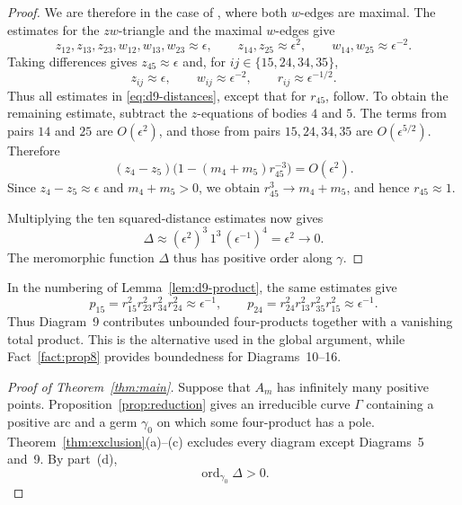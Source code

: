 \documentclass[Threeside,11pt]{article}
\theoremstyle{definition}
\theoremstyle{remark}
\numberwithin{equation}{section}
\theoremstyle{remark}
\newcommand{\ord}{\operatorname{ord}}
\begin{document}
{\begin{proof}
We are therefore in the case of \cite[\S8.9.2]{AK}, where both $w$-edges are
maximal.  The estimates for the $zw$-triangle and the maximal $w$-edges give
\[
 z_{12},z_{13},z_{23},w_{12},w_{13},w_{23}\approx\epsilon,
 \qquad z_{14},z_{25}\approx\epsilon^2,
 \qquad w_{14},w_{25}\approx\epsilon^{-2}.
\]
Taking differences gives $z_{45}\approx\epsilon$ and, for
$ij\in\{15,24,34,35\}$,
\[
 z_{ij}\approx\epsilon,\qquad w_{ij}\approx\epsilon^{-2},
 \qquad r_{ij}\approx\epsilon^{-1/2}.
\]
Thus all estimates in \eqref{eq:d9-distances}, except that for $r_{45}$, follow.
To obtain the remaining estimate, subtract the $z$-equations of bodies $4$ and $5$.
The terms from pairs $14$ and $25$ are $O(\epsilon^2)$, and those from pairs
$15,24,34,35$ are $O(\epsilon^{5/2})$.  Therefore
\[
 (z_4-z_5)\bigl(1-(m_4+m_5)r_{45}^{-3}\bigr)=O(\epsilon^2).
\]
Since $z_4-z_5\approx\epsilon$ and $m_4+m_5>0$, we obtain
$r_{45}^3\to m_4+m_5$, and hence $r_{45}\approx1$.

Multiplying the ten squared-distance estimates now gives
\[
 \Delta\approx(\epsilon^2)^3\,1^3\,(\epsilon^{-1})^4
 =\epsilon^2\longrightarrow0.
\]
The meromorphic function $\Delta$ thus has positive order along $\gamma$.
\end{proof}

In the numbering of Lemma~\ref{lem:d9-product}, the same estimates give
\[
 p_{15}=r_{15}^2r_{23}^2r_{34}^2r_{24}^2\approx\epsilon^{-1},\qquad
 p_{24}=r_{24}^2r_{13}^2r_{35}^2r_{15}^2\approx\epsilon^{-1}.
\]
Thus Diagram~9 contributes unbounded four-products together with a vanishing total product.
This is the alternative used in the global argument, while Fact~\ref{fact:prop8}
provides boundedness for Diagrams~10--16.

\begin{proof}[Proof of Theorem~\ref{thm:main}]
Suppose that $A_m$ has infinitely many positive points.  Proposition~\ref{prop:reduction}
gives an irreducible curve $\Gamma$ containing a positive arc and a germ $\gamma_0$ on which
some four-product has a pole.  Theorem~\ref{thm:exclusion}(a)--(c) excludes every diagram
except Diagrams~5 and~9.  By part~(d),
\[
 \ord_{\gamma_0}\Delta>0.
\]


\end{proof}}
\end{document}

